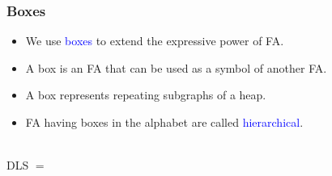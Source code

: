 \documentclass{beamer}
\newcommand{\hlbl}[1]{\textcolor{blue}{#1}}
\begin{document}

 
\begin{frame}
\frametitle{Boxes}

\begin{itemize}
		\item We use \hlbl{boxes} to extend the expressive power of FA.
		\item A box is an FA that can be used as a symbol of another FA.
		\item A box represents repeating subgraphs of a heap.
		\item FA having boxes in the alphabet are called \hlbl{hierarchical}.
	\end{itemize}
		\vspace{-0.8cm}
		\centering \\
		\vspace{0.7cm}
		\centering DLS $=$ \\
		\vspace{-0.8cm}
		\centering 
\end{frame}

\end{document}
